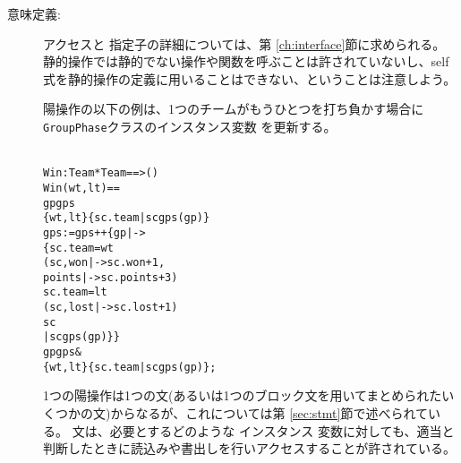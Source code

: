 \documentclass[\pformat,12pt]{jarticle}
\begin{document}
\begin{description}












\item[意味定義:]
アクセスと  指定子の詳細については、第 \ref{ch:interface}節に求められる。
静的操作では静的でない操作や関数を呼ぶことは許されていないし、self式を静的操作の定義に用いることはできない、ということは注意しよう。

陽操作の以下の例は、1つのチームがもうひとつを打ち負かす場合に
\texttt{GroupPhase}クラスのインスタンス変数
を更新する。
\begin{alltt}\label{winDef}
  Win : Team * Team ==> ()
  Win (wt,lt) ==
     gp  gps  
         \{wt,lt\}  \{sc.team | sc  gps(gp)\}
     gps := gps ++ \{ gp |-> 
                        \{ sc.team = wt
                         (sc, won |-> sc.won + 1,
                                     points |-> sc.points + 3)
                          sc.team = lt
                         (sc, lost |-> sc.lost + 1)
                          sc 
                    | sc  gps(gp)\}\}
      gp  gps & 
          \{wt,lt\}  \{sc.team | sc  gps(gp)\};
\end{alltt}
1つの陽操作は1つの文(あるいは1つのブロック文を用いてまとめられたいくつかの文)からなるが、これについては第 \ref{sec:stmt}節で述べられている。 
文は、必要とするどのような
インスタンス
変数に対しても、適当と判断したときに読込みや書出しを行いアクセスすることが許されている。


\end{description}
\end{document}
